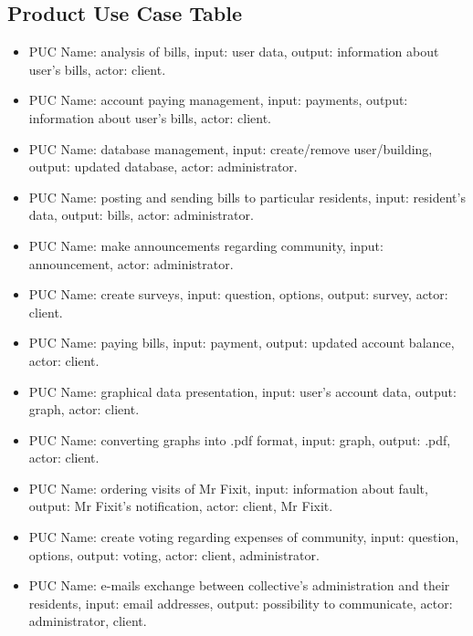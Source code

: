 \documentclass[a4paper,11pt,onecolumn,oneside]{book}
\begin{document}
\subsection{Product Use Case Table}
\begin{itemize}
\item PUC Name: analysis of bills,
input: user data,
output: information about user's bills,
actor: client.

\item PUC Name: account paying management,
input: payments,
output: information about user's bills,
actor: client.

\item PUC Name: database management,
input: create/remove user/building,
output: updated database,
actor: administrator.

\item PUC Name: posting and sending bills to particular residents,
input: resident's data,
output: bills,
actor: administrator.

\item PUC Name: make announcements regarding community,
input: announcement,
actor: administrator.

\item PUC Name: create surveys,
input: question, options,
output: survey,
actor: client.

\item PUC Name: paying bills,
input: payment,
output: updated account balance,
actor: client.

\item PUC Name: graphical data presentation,
input: user's account data,
output: graph,
actor: client.

\item PUC Name: converting graphs into .pdf format,
input: graph,
output: .pdf,
actor: client.

\item PUC Name: ordering visits of Mr Fixit,
input: information about fault,
output: Mr Fixit's notification,
actor: client, Mr Fixit.

\item PUC Name: create voting regarding expenses of community, 
input: question, options,
output: voting,
actor: client, administrator.

\item PUC Name: e-mails exchange between collective’s administration and their residents, 
input: email addresses,
output: possibility to communicate,
actor: administrator, client.
\end{itemize}
\end{document}
